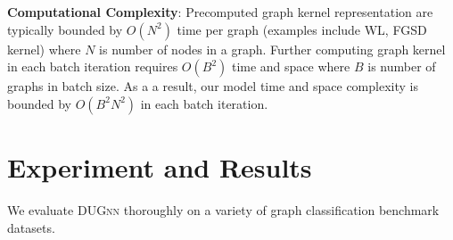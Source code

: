 \documentclass{article}
\begin{document}
\noindent \textbf{Computational Complexity}: Precomputed graph kernel representation are typically bounded by $O(N^2)$ time per graph (examples include WL, FGSD kernel) where $N$ is number of nodes in a graph. Further computing graph kernel in each batch iteration requires  $O(B^2)$ time and space  where $B$ is number of graphs in batch size. As a a result, our model time and space complexity is bounded by $O(B^2N^2)$ in each batch iteration. 





\section{Experiment and Results}\label{sec:exp_results}

We evaluate  \textsc{DUGnn}   thoroughly on a variety of graph classification benchmark datasets.
\end{document}
